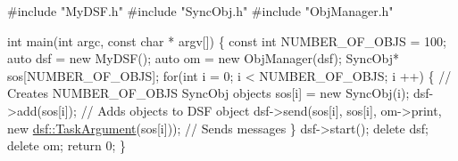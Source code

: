 \begin{DoxyCodeInclude}
\textcolor{preprocessor}{#include "MyDSF.h"}
\textcolor{preprocessor}{#include "SyncObj.h"}
\textcolor{preprocessor}{#include "ObjManager.h"}

\textcolor{keywordtype}{int} main(\textcolor{keywordtype}{int} argc, \textcolor{keyword}{const} \textcolor{keywordtype}{char} * argv[]) \{
    \textcolor{keyword}{const} \textcolor{keywordtype}{int} NUMBER\_OF\_OBJS = 100;
    \textcolor{keyword}{auto} dsf = \textcolor{keyword}{new} MyDSF();
    \textcolor{keyword}{auto} om = \textcolor{keyword}{new} ObjManager(dsf);
    SyncObj* sos[NUMBER\_OF\_OBJS];
    \textcolor{keywordflow}{for}(\textcolor{keywordtype}{int} i = 0; i < NUMBER\_OF\_OBJS; i ++) \{ \textcolor{comment}{// Creates NUMBER\_OF\_OBJS SyncObj objects}
        sos[i] = \textcolor{keyword}{new} SyncObj(i);
        dsf->add(sos[i]); \textcolor{comment}{// Adds objects to DSF object}
        dsf->send(sos[i], sos[i], om->print, \textcolor{keyword}{new} \hyperlink{namespacedsf_abe4bf68433935a81c31a5ada9b17663a}{dsf::TaskArgument}(sos[i])); \textcolor{comment}{// Sends
       messages}
    \}
    dsf->start();
    \textcolor{keyword}{delete} dsf;
    \textcolor{keyword}{delete} om;
    \textcolor{keywordflow}{return} 0;
\}
\end{DoxyCodeInclude}
 